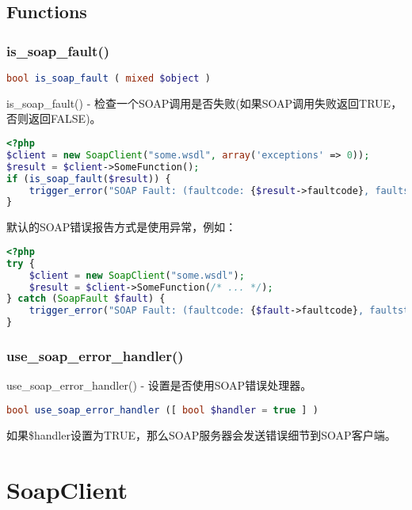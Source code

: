 \section{Functions}


\subsection{is\_soap\_fault()}

\begin{lstlisting}[language=PHP]
bool is_soap_fault ( mixed $object )
\end{lstlisting}


is\_soap\_fault() - 检查一个SOAP调用是否失败(如果SOAP调用失败返回TRUE，否则返回FALSE)。

\begin{lstlisting}[language=PHP]
<?php
$client = new SoapClient("some.wsdl", array('exceptions' => 0));
$result = $client->SomeFunction();
if (is_soap_fault($result)) {
    trigger_error("SOAP Fault: (faultcode: {$result->faultcode}, faultstring: {$result->faultstring})", E_USER_ERROR);
}
\end{lstlisting}

默认的SOAP错误报告方式是使用异常，例如：

\begin{lstlisting}[language=PHP]
<?php
try {
    $client = new SoapClient("some.wsdl");
    $result = $client->SomeFunction(/* ... */);
} catch (SoapFault $fault) {
    trigger_error("SOAP Fault: (faultcode: {$fault->faultcode}, faultstring: {$fault->faultstring})", E_USER_ERROR);
}
\end{lstlisting}


\subsection{use\_soap\_error\_handler()}

use\_soap\_error\_handler() - 设置是否使用SOAP错误处理器。




\begin{lstlisting}[language=PHP]
bool use_soap_error_handler ([ bool $handler = true ] )
\end{lstlisting}

如果\$handler设置为TRUE，那么SOAP服务器会发送错误细节到SOAP客户端。




\chapter{SoapClient}

